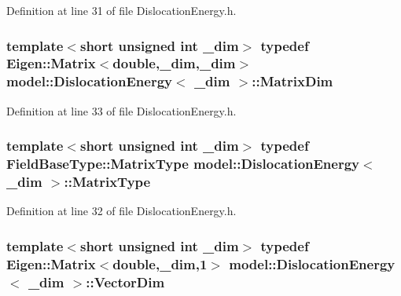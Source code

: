 Definition at line 31 of file Dislocation\+Energy.\+h.

\hypertarget{classmodel_1_1_dislocation_energy_ab88bf490cc2bac987ef0da961a7c9762}{}
\subsubsection[{Matrix\+Dim}]{\setlength{\rightskip}{0pt plus 5cm}template$<$short unsigned int \+\_\+dim$>$ typedef Eigen\+::\+Matrix$<$double,\+\_\+dim,\+\_\+dim$>$ {\bf model\+::\+Dislocation\+Energy}$<$ \+\_\+dim $>$\+::{\bf Matrix\+Dim}}\label{classmodel_1_1_dislocation_energy_ab88bf490cc2bac987ef0da961a7c9762}


Definition at line 33 of file Dislocation\+Energy.\+h.

\hypertarget{classmodel_1_1_dislocation_energy_a3cb7da857732ef0ffe2ed45d06737097}{}
\subsubsection[{Matrix\+Type}]{\setlength{\rightskip}{0pt plus 5cm}template$<$short unsigned int \+\_\+dim$>$ typedef {\bf Field\+Base\+Type\+::\+Matrix\+Type} {\bf model\+::\+Dislocation\+Energy}$<$ \+\_\+dim $>$\+::{\bf Matrix\+Type}}\label{classmodel_1_1_dislocation_energy_a3cb7da857732ef0ffe2ed45d06737097}


Definition at line 32 of file Dislocation\+Energy.\+h.

\hypertarget{classmodel_1_1_dislocation_energy_a8489d465a19e782a7d74db70c6bcde18}{}
\subsubsection[{Vector\+Dim}]{\setlength{\rightskip}{0pt plus 5cm}template$<$short unsigned int \+\_\+dim$>$ typedef Eigen\+::\+Matrix$<$double,\+\_\+dim,1$>$ {\bf model\+::\+Dislocation\+Energy}$<$ \+\_\+dim $>$\+::{\bf Vector\+Dim}}\label{classmodel_1_1_dislocation_energy_a8489d465a19e782a7d74db70c6bcde18}


